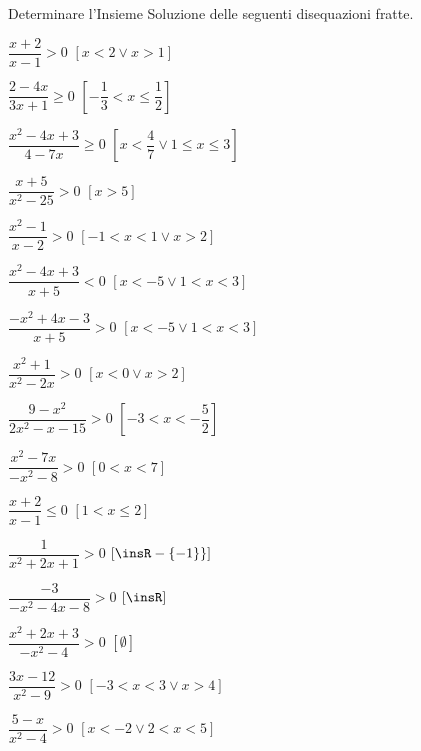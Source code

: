 
\begin{esercizio}[\Ast]
 \label{ese:4.58}
Determinare l'Insieme Soluzione delle seguenti disequazioni fratte.
\begin{multicols}{2}
\begin{enumeratea}
\item \(\dfrac{x+2}{x-1}>0\) \hfill \(\left[x<2\vee x>1\right]\)
\item \(\dfrac{2-4x}{3x+1}\ge 0\) \hfill \(\left[-\dfrac 1 3<x\le \dfrac 1 
2\right]\)
\item \(\dfrac{x^2-4x+3}{4-7x}\ge 0\) 
 \hfill \(\left[x<\dfrac 4 7\vee 1\le x\le 3\right]\)
\item \(\dfrac{x+5}{x^2-25}>0\) \hfill \(\left[x>5\right]\)
\item \(\dfrac{x^2-1}{x-2}>0\) \hfill \(\left[-1<x<1\vee x>2\right]\)
\item \(\dfrac{x^2-4x+3}{x+5}<0\) \hfill \(\left[x<-5\vee 1<x<3\right]\)
\item \(\dfrac{-x^2+4x-3}{x+5}>0\) \hfill \(\left[x<-5\vee 1<x<3\right]\)
\item \(\dfrac{x^2+1}{x^2-2x}>0\) \hfill \(\left[x<0\vee x>2\right]\)
\item \(\dfrac{9-x^2}{2x^2-x-15}>0\) \hfill \(\left[-3<x<-\dfrac 5 2\right]\)
\item \(\dfrac{x^2-7x}{-x^2-8}>0\) \hfill \(\left[0<x<7\right]\)
\item \(\dfrac{x+2}{x-1}\le 0\) \hfill \(\left[1< x\le 2\right]\)
\item \(\dfrac 1{x^2+2x+1}>0\) \hfill \(\left[\insR-\{-1\}\}\right]\)
\item \(\dfrac{-3}{-x^2-4x-8}>0\) \hfill \(\left[\insR\right]\)
\item \(\dfrac{x^2+2x+3}{-x^2-4}>0\) \hfill \(\left[\emptyset\right]\)
\item \(\dfrac{3x-12}{x^2-9}>0\) \hfill \(\left[-3<x<3\vee x>4\right]\)
\item \(\dfrac{5-x}{x^2-4}>0\) \hfill \(\left[x<-2\vee 2<x<5\right]\)
\end{enumeratea}
\end{multicols}
\end{esercizio}

